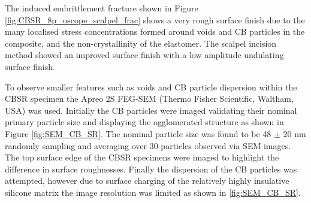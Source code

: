 The induced embrittlement fracture shown in Figure \ref{fig:CBSR_8p_uscope_scalpel_frac} shows a very rough surface finish due to the many localised stress concentrations formed around voids and CB particles in the composite, and the non-crystallinity of the elastomer. The scalpel incision method showed an improved surface finish with a low amplitude undulating surface finish.

To observe smaller features such as voids and CB particle dispersion within the CBSR specimen the Apreo 2S FEG-SEM (Thermo Fisher Scientific, Waltham, USA) was used. Initially the CB particles were imaged validating their nominal primary particle size and displaying the agglomerated structure as shown in Figure \ref{fig:SEM_CB_SR}. The nominal particle size was found to be 48 $\pm$ 20 nm randomly sampling and averaging over 30 particles observed via SEM images. The top surface edge of the CBSR specimens were imaged to highlight the difference in surface roughnesses. Finally the dispersion of the CB particles was attempted, however due to surface charging of the relatively highly insulative silicone matrix the image resolution was limited as shown in \ref{fig:SEM_CB_SR}. 
